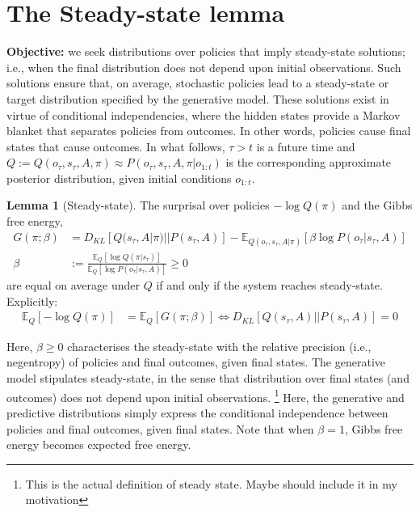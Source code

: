 \documentclass{article}
\theoremstyle{plain}
\theoremstyle{definition}
\theoremstyle{proposition}
\theoremstyle{corollary}
\theoremstyle{lemma}
\newtheorem{lemma}[thm]{Lemma}
\theoremstyle{remark}
\theoremstyle{example}
\begin{document}
\appendix
\section{The Steady-state lemma}

\textbf{Objective:} we seek distributions over policies that imply steady-state solutions; i.e., when the final distribution does not depend upon initial observations. Such solutions ensure that, on average, stochastic policies lead to a steady-state or target distribution specified by the generative model. These solutions exist in virtue of conditional independencies, where the hidden states provide a Markov blanket that separates policies from outcomes. In other words, policies cause final states that cause outcomes. In what follows, $\tau >t$ is a future time and $Q:=Q(o_\tau, s_\tau, A, \pi) \approx P(o_\tau, s_\tau, A, \pi|o_{1:t})$ is the corresponding approximate posterior distribution, given initial conditions $o_{1:t}$.

\begin{lemma}[Steady-state]
The surprisal over policies $-\log Q(\pi)$ and the Gibbs free energy,
\begin{align}
    G(\pi; \beta) &= D_{KL}[Q(s_\tau, A|\pi)||P(s_\tau,A)]-\mathbb E_{Q(o_\tau, s_\tau, A|\pi)} [\beta \log P(o_\tau |s_\tau, A)] \\
    \beta &:= \frac{\mathbb E_Q[\log Q(\pi|s_\tau)]}{\mathbb E_Q[\log P(o_\tau|s_\tau,A)]} \geq 0
\end{align}
are equal on average under $Q$ if and only if the system reaches steady-state. Explicitly:
\begin{align}
    \mathbb E_Q[-\log Q(\pi)]&= \mathbb E_Q[G(\pi; \beta)] \iff D_{KL}[Q(s_\tau, A) ||P(s_\tau, A)]=0
\end{align}
\end{lemma}

Here, $\beta \geq 0$ characterises the steady-state with the relative precision (i.e., negentropy) of policies and final outcomes, given final states. The generative model stipulates steady-state, in the sense that distribution over final states (and outcomes) does not depend upon initial observations. \footnote{This is the actual definition of steady state. Maybe should include it in my motivation} Here, the generative and predictive distributions simply express the conditional independence between policies and final outcomes, given final states. Note that when $\beta = 1$, Gibbs free energy becomes expected free energy.
\end{document}
